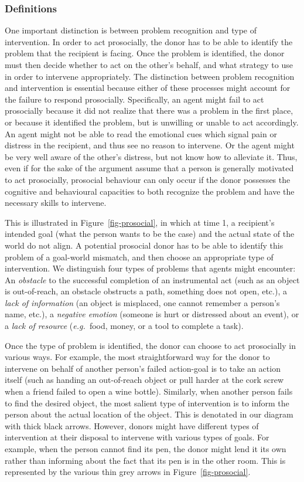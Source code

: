 \documentclass{article}
\newcommand{\eg}{{\textit{e.g.~}}}
\begin{document}
\subsubsection{Definitions}

One important distinction is between problem recognition and type of
intervention. In order to act prosocially, the donor has to be able to identify
the problem that the recipient is facing. Once the problem is identified, the
donor must then decide whether to act on the other's behalf, and what
strategy to use in order to intervene appropriately. The distinction between
problem recognition and intervention is essential because either of these
processes might account for the failure to respond prosocially. Specifically,
an agent might fail to act prosocially because it did not realize that there
was a problem in the first place, or because it identified the problem, but is
unwilling or unable to act accordingly. An agent might not be able to read the
emotional cues which signal pain or distress in the recipient, and thus see no
reason to intervene. Or the agent might be very well aware of the other's
distress, but not know how to alleviate it. Thus, even if for the sake of the
argument assume that a person is generally motivated to act prosocially,
prosocial behaviour can only occur if the donor possesses the cognitive and
behavioural capacities to both recognize the problem and have the necessary
skills to intervene.

This is illustrated in Figure~\ref{fig-prosocial}, in
which at time 1, a recipient's intended goal (what the person wants to be the
case) and the actual state of the world do not align. A potential prosocial
donor has to be able to identify this problem of a goal-world mismatch, and
then choose an appropriate type of intervention. We distinguish four types of
problems that agents might encounter: An \emph{obstacle} to the successful completion
of an instrumental act (such as an object is out-of-reach, an obstacle
obstructs a path, something does not open, etc.), a \emph{lack of information} (an
object is misplaced, one cannot remember a person's name, etc.), a \emph{negative
emotion} (someone is hurt or distressed about an event), or a \emph{lack of resource}
(\eg food, money, or a tool to complete a task).

Once the type of problem is
identified, the donor can choose to act prosocially in various ways. For
example, the most straightforward way for the donor to intervene on behalf of
another person's failed action-goal is to take an action itself (such as
handing an out-of-reach object or pull harder at the cork screw when a friend
failed to open a wine bottle). Similarly, when another person fails to find
the desired object, the most salient type of intervention is to inform the
person about the actual location of the object. This is denotated in our
diagram with thick black arrows. However, donors might have different types of
intervention at their disposal to intervene with various types of goals. For
example, when the person cannot find its pen, the donor might lend it its own
rather than informing about the fact that its pen is in the other room.
This is represented by the various thin grey arrows in
Figure~\ref{fig-prosocial}.
\end{document}
